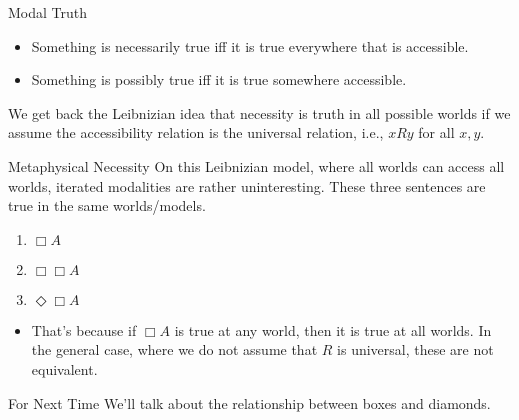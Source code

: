 \documentclass[
  14pt,
  letterpaper,
  ignorenonframetext,
  aspectratio=169,
]{beamer}
\providecommand{\tightlist}{%
  \setlength{\itemsep}{0pt}\setlength{\parskip}{0pt}}\usepackage{longtable,booktabs,array}
\begin{document}
\begin{frame}{Modal Truth}
\protect\hypertarget{modal-truth}{}
\begin{itemize}[<+->]
\tightlist
\item
  Something is necessarily true iff it is true everywhere that is
  accessible.
\item
  Something is possibly true iff it is true somewhere accessible. \pause
\end{itemize}

We get back the Leibnizian idea that necessity is truth in all possible
worlds if we assume the accessibility relation is the universal
relation, i.e., \(xRy\) for all \(x, y\).
\end{frame}

\begin{frame}{Metaphysical Necessity}
\protect\hypertarget{metaphysical-necessity}{}
On this Leibnizian model, where all worlds can access all worlds,
iterated modalities are rather uninteresting. These three sentences are
true in the same worlds/models.

\begin{enumerate}[<+->]
\tightlist
\item
  \(\Box A\)
\item
  \(\Box \Box A\)
\item
  \(\Diamond \Box A\)
\end{enumerate}

\begin{itemize}[<+->]
\tightlist
\item
  That's because if \(\Box A\) is true at any world, then it is true at
  all worlds. In the general case, where we do not assume that \(R\) is
  universal, these are not equivalent.
\end{itemize}
\end{frame}

\begin{frame}{For Next Time}
\protect\hypertarget{for-next-time}{}
We'll talk about the relationship between boxes and diamonds.
\end{frame}
\end{document}
